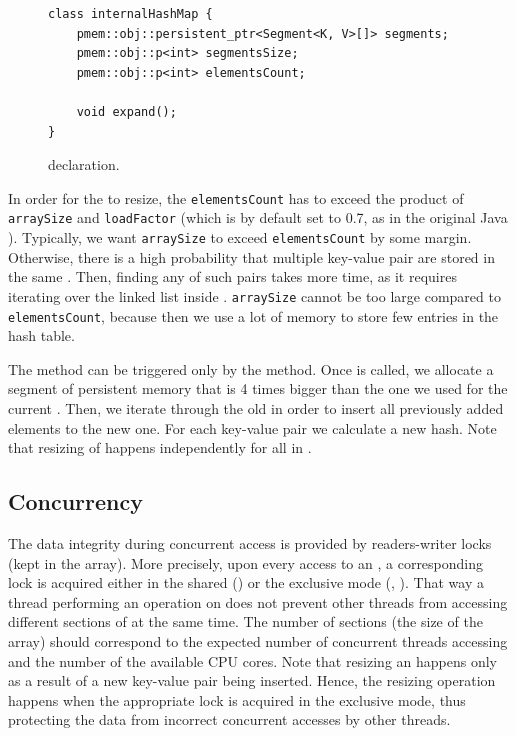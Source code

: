 \begin{figure}[ht]
\renewcommand{\figurename}{Listing}
\begin{lstlisting}
class internalHashMap {
    pmem::obj::persistent_ptr<Segment<K, V>[]> segments;
    pmem::obj::p<int> segmentsSize;
    pmem::obj::p<int> elementsCount;
    
    void expand();
}
\end{lstlisting}
\caption{\internalHashMap declaration.}
\label{internalHashMap}
\end{figure}

    In order for the \internalHashMap to resize, the \texttt{elementsCount} has to exceed the product of \texttt{arraySize} and \texttt{loadFactor} (which is by default set to 0.7, as in the original Java \HashMap \cite{HashMapJava}).
    Typically, we want \texttt{arraySize} to exceed \texttt{elementsCount} by some margin. 
    Otherwise, there is a high probability that multiple key-value pair are stored in the same \Segment. 
    Then, finding any of such pairs takes more time, as it requires iterating over the linked list inside \Segment. 
    \texttt{arraySize} cannot be too large compared to \texttt{elementsCount}, because then we use a lot of memory to store few entries in the hash table.

    The \expandMethod method can be triggered only by the \insertMethod method.
    Once \expandMethod is called, we allocate a segment of persistent memory that is 4 times bigger than the one we used for the current \internalHashMap. 
    Then, we iterate through the old \internalHashMap in order to insert all previously added elements to the new one. 
    For each key-value pair we calculate a new hash. 
    Note that resizing of \internalHashMap happens independently for all \internalHashMap in \NvmHashMap.

\subsection{Concurrency} 
    
    The data integrity during concurrent access is provided by readers-writer locks (kept in the \locks array). 
    More precisely, upon every access to an \internalHashMap, a corresponding lock is acquired either in the shared (\getMethod) or the exclusive mode (\insertMethod, \removeMethod). 
    That way a thread performing an operation on \PHT does not prevent other threads from accessing different sections of \PHT at the same time. 
    The number of sections (the size of the \internalHashMap array) should correspond to the expected number of concurrent threads accessing \PHT and the number of the available CPU cores. 
    Note that resizing an \internalHashMap happens only as a result of a new key-value pair being inserted. 
    Hence, the resizing operation happens when the appropriate lock is acquired in the exclusive mode, thus protecting the data from incorrect concurrent accesses by other threads.
            

